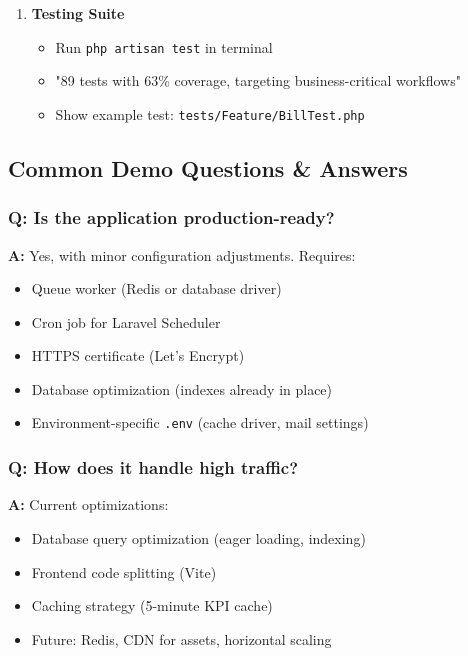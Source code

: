 \begin{enumerate}
    \item \textbf{Testing Suite}
    \begin{itemize}
        \item Run \texttt{php artisan test} in terminal
        \item "89 tests with 63\% coverage, targeting business-critical workflows"
        \item Show example test: \texttt{tests/Feature/BillTest.php}
    \end{itemize}
\end{enumerate}

\subsection{Common Demo Questions \& Answers}

\subsubsection{Q: Is the application production-ready?}

\textbf{A:} Yes, with minor configuration adjustments. Requires:
\begin{itemize}
    \item Queue worker (Redis or database driver)
    \item Cron job for Laravel Scheduler
    \item HTTPS certificate (Let's Encrypt)
    \item Database optimization (indexes already in place)
    \item Environment-specific \texttt{.env} (cache driver, mail settings)
\end{itemize}

\subsubsection{Q: How does it handle high traffic?}

\textbf{A:} Current optimizations:
\begin{itemize}
    \item Database query optimization (eager loading, indexing)
    \item Frontend code splitting (Vite)
    \item Caching strategy (5-minute KPI cache)
    \item Future: Redis, CDN for assets, horizontal scaling
\end{itemize}

